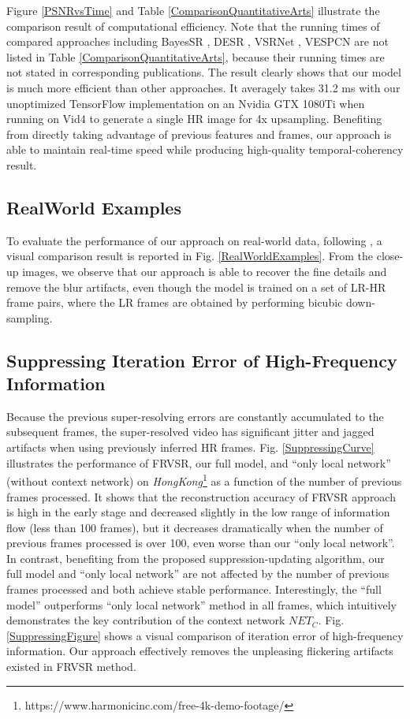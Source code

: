 \documentclass[letterpaper]{article} %
\begin{document}
Figure \ref{PSNRvsTime} and Table \ref{ComparisonQuantitativeArts} illustrate the comparison result of computational efficiency. Note that the running times of compared approaches including BayesSR \cite{BayesSR2011cvpr}, DESR \cite{DESR2015iccv}, VSRNet \cite{VSRNet2016TCT}, VESPCN \cite{VESPCN2017cvpr} are not listed in Table \ref{ComparisonQuantitativeArts}, because their running times are not stated in corresponding publications. The result clearly shows that our model is much more efficient than other approaches. It averagely takes 31.2 ms with our unoptimized TensorFlow implementation on an Nvidia GTX 1080Ti when running on Vid4 to generate a single HR image for 4x upsampling. Benefiting from directly taking advantage of previous features and frames, our approach is able to maintain real-time speed while producing high-quality temporal-coherency result.


\subsection{RealWorld Examples}


To evaluate the performance of our approach on real-world data, following \cite{VESPCN2017cvpr}, a visual comparison result is reported in Fig. \ref{RealWorldExamples}. From the close-up images, we observe that our approach is able to recover the fine details and remove the blur artifacts, even though the model is trained on a set of LR-HR frame pairs, where the LR frames are obtained by performing bicubic down-sampling.



\subsection{Suppressing Iteration Error of High-Frequency Information}

Because the previous super-resolving errors are constantly accumulated to the subsequent frames, the super-resolved video has significant jitter and jagged artifacts when using previously inferred HR frames. Fig. \ref{SuppressingCurve} illustrates the performance of FRVSR, our full model, and ``only local network'' (without context network) on \textit{HongKong}\footnote{https://www.harmonicinc.com/free-4k-demo-footage/} as a function of the number of previous frames processed. It shows that the reconstruction accuracy of FRVSR approach is high in the early stage and decreased slightly in the low range of information flow (less than 100 frames), but it decreases dramatically when the number of previous frames processed is over 100, even worse than our ``only local network''. In contrast, benefiting from the proposed suppression-updating algorithm, our full model and ``only local network'' are not affected by the number of previous frames processed and both achieve stable performance. Interestingly, the ``full model'' outperforms ``only local network'' method in all frames, which intuitively demonstrates the key contribution of the context network $NET_C$. Fig. \ref{SuppressingFigure} shows a visual comparison of iteration error of high-frequency information. Our approach effectively removes the unpleasing flickering artifacts existed in FRVSR method.
\end{document}
